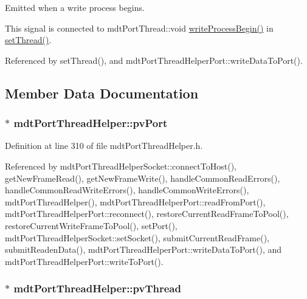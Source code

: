 Emitted when a write process begins. 

This signal is connected to mdt\-Port\-Thread\-::void \hyperlink{classmdt_port_thread_helper_a80df5929776f6c617b96f2184e2bc96d}{write\-Process\-Begin()} in \hyperlink{classmdt_port_thread_helper_af6c9d2cb2e9e922942236068bf634b0b}{set\-Thread()}. 

Referenced by set\-Thread(), and mdt\-Port\-Thread\-Helper\-Port\-::write\-Data\-To\-Port().



\subsection{Member Data Documentation}
\hypertarget{classmdt_port_thread_helper_ada4497db38cb418c2021aecaf4caa36c}{
\subsubsection[{pv\-Port}]{$\ast$ mdt\-Port\-Thread\-Helper\-::pv\-Port\hspace{0.3cm}{\ttfamily [protected]}}}\label{classmdt_port_thread_helper_ada4497db38cb418c2021aecaf4caa36c}


Definition at line 310 of file mdt\-Port\-Thread\-Helper.\-h.



Referenced by mdt\-Port\-Thread\-Helper\-Socket\-::connect\-To\-Host(), get\-New\-Frame\-Read(), get\-New\-Frame\-Write(), handle\-Common\-Read\-Errors(), handle\-Common\-Read\-Write\-Errors(), handle\-Common\-Write\-Errors(), mdt\-Port\-Thread\-Helper(), mdt\-Port\-Thread\-Helper\-Port\-::read\-From\-Port(), mdt\-Port\-Thread\-Helper\-Port\-::reconnect(), restore\-Current\-Read\-Frame\-To\-Pool(), restore\-Current\-Write\-Frame\-To\-Pool(), set\-Port(), mdt\-Port\-Thread\-Helper\-Socket\-::set\-Socket(), submit\-Current\-Read\-Frame(), submit\-Readen\-Data(), mdt\-Port\-Thread\-Helper\-Port\-::write\-Data\-To\-Port(), and mdt\-Port\-Thread\-Helper\-Port\-::write\-To\-Port().

\hypertarget{classmdt_port_thread_helper_a44780de0f664de18ca999ef43321c525}{
\subsubsection[{pv\-Thread}]{$\ast$ mdt\-Port\-Thread\-Helper\-::pv\-Thread\hspace{0.3cm}{\ttfamily [protected]}}}\label{classmdt_port_thread_helper_a44780de0f664de18ca999ef43321c525}


